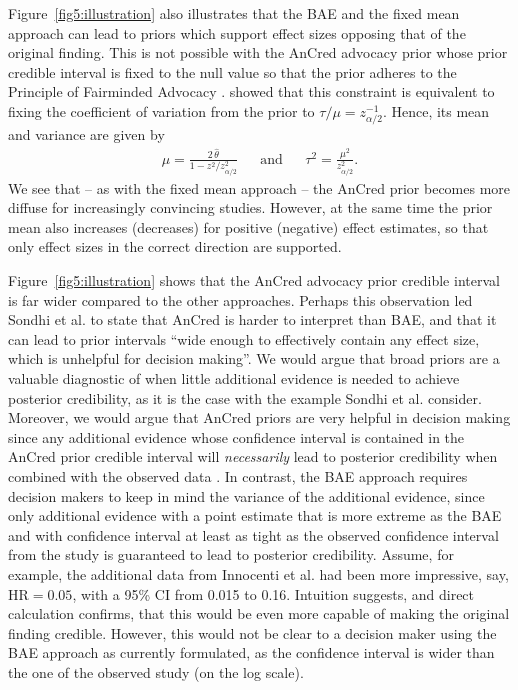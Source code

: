 Figure~\ref{fig5:illustration} also illustrates that the BAE and the fixed mean
approach can lead to priors which support effect sizes opposing that of the
original finding. This is not possible with the AnCred advocacy prior whose
prior credible interval is fixed to the null value so that the prior adheres to
the Principle of Fairminded Advocacy \citep{Matthews2018}. \citet{Held2021b}
showed that this constraint is equivalent to fixing the coefficient of variation
from the prior to $\tau/\mu = z_{\scriptscriptstyle \alpha/2}^{-1}$. Hence, its
mean and variance are given by
\begin{align*}
  &\mu = \frac{2 \, \hat{\theta}}{1 - z^{2}/z_{\scriptscriptstyle \alpha/2}^{2}}&
  &\text{and}&
  &\tau^{2} = \frac{\mu^{2}}{z_{\scriptscriptstyle \alpha/2}^{2}}.&
\end{align*}
We see that -- as with the fixed mean approach -- the AnCred prior becomes more
diffuse for increasingly convincing studies. However, at the same time the prior
mean also increases (decreases) for positive (negative) effect estimates, so
that only effect sizes in the correct direction are supported.

Figure~\ref{fig5:illustration} shows that the AnCred advocacy prior credible
interval is far wider compared to the other approaches. Perhaps this observation
led Sondhi et al. to state that AnCred is harder to interpret than BAE, and that
it can lead to prior intervals ``wide enough to effectively contain any effect
size, which is unhelpful for decision making''. We would argue that broad priors
are a valuable diagnostic of when little additional evidence is needed to
achieve posterior credibility, as it is the case with the example Sondhi et al.
consider. Moreover, we would argue that AnCred priors are very helpful in
decision making since any additional evidence whose confidence interval is
contained in the AnCred prior credible interval will \emph{necessarily} lead to
posterior credibility when combined with the observed data \citep{Held2021b}. In
contrast, the BAE approach requires decision makers to keep in mind the variance
of the additional evidence, since only additional evidence with a point estimate
that is more extreme as the BAE and with confidence interval at least as tight
as the observed confidence interval from the study is guaranteed to lead to
posterior credibility. Assume, for example, the additional data from Innocenti
et al. had been more impressive, say, $\mbox{HR} = 0.05$, with a 95\% CI from
0.015 to 0.16. Intuition suggests, and direct calculation confirms, that this
would be even more capable of making the original finding credible. However,
this would not be clear to a decision maker using the BAE approach as currently
formulated, as the confidence interval is wider than the one of the observed
study (on the log scale).

